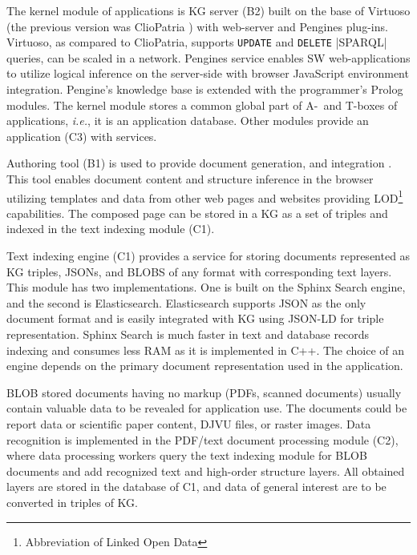 \documentclass[
]{ceurart}
\begin{document}
The kernel module of applications is KG server (B2) built on the base of Virtuoso \cite{virtuoso} (the previous version was ClioPatria \cite{cliopatria}) with web-server and Pengines plug-ins.  %
Virtuoso, as compared to ClioPatria, supports \verb|UPDATE| and \verb|DELETE| \varb|SPARQL| queries, can be scaled in a network.  Pengines service enables SW web-applications to utilize logical inference on the server-side with browser JavaScript environment integration.  Pengine's knowledge base is extended with the programmer's Prolog modules.  The kernel module stores a common global part of A-~and T-boxes of applications, \emph{i.e.}, it is an application database.  Other modules provide an application (C3) with services.

Authoring tool (B1) is used to provide document generation, and integration \cite{zont19}.  This tool enables document content and structure inference in the browser utilizing templates and data from other web pages and websites providing LOD\footnote{Abbreviation of Linked Open Data} \cite{lod} capabilities. The composed page can be stored in a KG as a set of triples and indexed in the text indexing module (C1).

Text indexing engine (C1) provides a service for storing documents represented as KG triples, JSONs, and BLOBS of any format with corresponding text layers.  This module has two implementations.  One is built on the Sphinx Search engine, and the second is Elasticsearch.  Elasticsearch supports JSON as the only document format and is easily integrated with KG using JSON-LD for triple representation.  Sphinx Search is much faster in text and database records indexing and consumes less RAM as it is implemented in C++.  The choice of an engine depends on the primary document representation used in the application.

BLOB stored documents having no markup (PDFs, scanned documents) usually contain valuable data to be revealed for application use.  The documents could be report data or scientific paper content, DJVU files, or raster images.  Data recognition is implemented in the PDF/text document processing module (C2), where data processing workers query the text indexing module for BLOB documents and add recognized text and high-order structure layers.  All obtained layers are stored in the database of C1, and data of general interest are to be converted in triples of KG.
\end{document}
